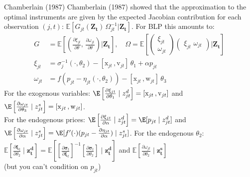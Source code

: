 \begin{frame}{Chamberlain (1987)}
Chamberlain (1987) showed that the approximation to the optimal instruments are given by the expected Jacobian contribution for each observation $(j,t)$: $\mathbb{E}[G_{jt}(\mathbf{Z_t})\, \Omega_{jt}^{-1} | \mathbf{Z_t}]$. For BLP this amounts to:
\begin{align*}
    G&=\mathbb{E}\left[
    \left(\frac{\partial \xi_{jt}}{\partial \theta}, \,
    \frac{\partial \omega_{jt}}{\partial \theta} \right)
| \mathbf{Z_t} \right], \quad 
\Omega = \mathbb{E}\left[
\begin{pmatrix}
    \xi_{jt} \\
    \omega_{jt}
\end{pmatrix}
\begin{pmatrix}
    \xi_{jt}\, \,
    \omega_{jt}
\end{pmatrix}
| \mathbf{Z_t} \right] \\
\xi_{jt} &= \sigma_j^{-1}(\cdot, \theta_2) - [\mathrm{x}_{jt} \,,  \mathrm{v}_{jt}]\, \theta_1 + \alpha p_{jt}\\
\omega_{jt} &= f\left(p_{jt}- \eta_{jt}(\cdot, \theta_2)  \right) -[\mathrm{x}_{jt} \,, \mathrm{w}_{jt}]\, \theta_3 
\end{align*}
For the exogenous variables: $\E\left[\frac{\partial \xi_{jt}}{\partial \theta_1} \mid  z_{jt}^{d} \right]=[\mathrm{x}_{jt} \,,  \mathrm{v}_{jt}]$ and
$\E\left[\frac{\partial \omega_{jt}}{\partial \theta_3} \mid  z_{jt}^{s} \right]=[\mathrm{x}_{jt} \,,  \mathrm{w}_{jt}]$.\\
For the endogenous prices: $\E\left[\frac{\partial \xi_{jt}}{\partial \alpha} \mid  z_{jt}^{d} \right]=\E[p_{jt} \mid z_{jt}^d]$ and
$\E\left[\frac{\partial \omega_{jt}}{\partial \alpha} \mid  z_{jt}^{s} \right]=\E[f'(\cdot) (p_{jt} - \frac{\partial \eta_{jt}}{\partial \alpha}) \mid z_{jt}^s]$.
For the endogenous $\theta_2$: $\mathbb{E}\left[\frac{\partial \boldsymbol{\xi}_{t}}{\partial \theta_2} \mid \mathbf{z_{t}^d} \right] 
=\mathbb{E}\left[\left[\frac{\partial \boldsymbol{\sigma}_{t}}{\partial \boldsymbol{\xi}_t}\right]^{-1} 
\left[\frac{\partial \boldsymbol{\sigma}_{t}}{\partial \theta_2}\right] \mid \mathbf{z_{t}^d} \right]$ and $\mathbb{E}\left[\frac{\partial \omega_{jt}}{\partial \theta_2} \mid \mathbf{z_{t}^s} \right]$\\ (but you can't condition on $p_{jt}$)
\end{frame}



